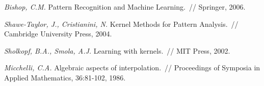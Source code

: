 \documentclass[12pt,fleqn]{article}
\begin{document}
	\begin{thebibliography}{1}
		\emph{Bishop, C.M.}
		Pattern Recognition and Machine Learning.~//
		Springer, 2006.
		
		\emph{Shawe-Taylor, J., Cristianini, N.}
		Kernel Methods for Pattern Analysis.~//
		Cambridge University Press, 2004.
		
		\emph{Sholkopf, B.A., Smola, A.J.}
		Learning with kernels.~//
		MIT Press, 2002.
		
		\emph{Micchelli, C.A.}
		Algebraic aspects of interpolation.~//
		Proceedings of Symposia in Applied Mathematics, 36:81-102, 1986.
	\end{thebibliography}
	
	
	
\end{document}
